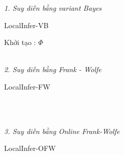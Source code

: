 \documentclass[fontsize=13pt]{scrartcl}
\begin{document}
\textit{1. Suy diễn bằng variant Bayes}
\begin{algorithm}[H]
\begin{algorithmic}
\caption{LocalInfer-VB}
\label{variantBayes}
\ENSURE{$\Phi$\\}
Khởi tạo : $\Phi$\\
\REPEAT
{}
\\
\end{algorithmic}
\end{algorithm}
\textit{2. Suy diễn bằng Frank - Wolfe}
 \begin{algorithm}[H]
\begin{algorithmic}
\caption{LocalInfer-FW}
\label{frankwolfeInfer}
\ENSURE{$\Phi$\\}
\\
\\
\end{algorithmic}
\end{algorithm} 
\textit{3. Suy diễn bằng Online Frank-Wolfe}
 \begin{algorithm}[H]
\begin{algorithmic}
\caption{LocalInfer-OFW}
\label{frankwolfeInfer}
\ENSURE{$\Phi$\\}
\\
\\
\end{algorithmic}
\end{algorithm} 
\end{document}
